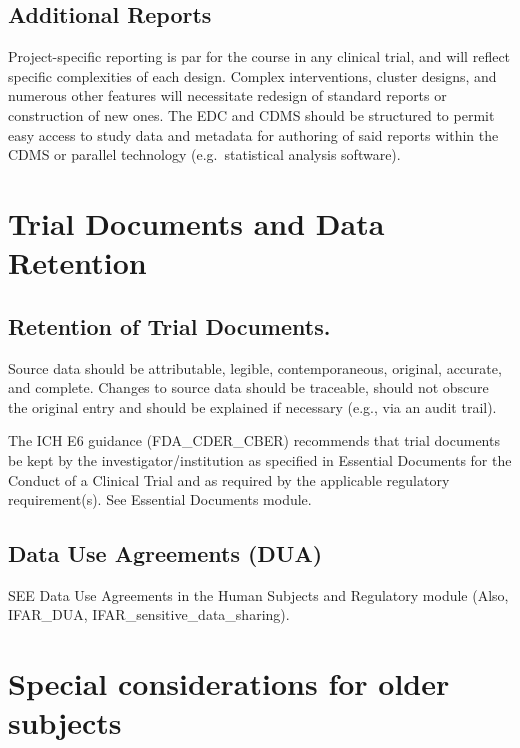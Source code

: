 \documentclass[]{book}
\begin{document}
\subsection{Additional Reports}\label{additional-reports}

Project-specific reporting is par for the course in any clinical trial,
and will reflect specific complexities of each design. Complex
interventions, cluster designs, and numerous other features will
necessitate redesign of standard reports or construction of new ones.
The EDC and CDMS should be structured to permit easy access to study
data and metadata for authoring of said reports within the CDMS or
parallel technology (e.g.~statistical analysis software).

\section{Trial Documents and Data
Retention}\label{trial-documents-and-data-retention}

\subsection{Retention of Trial
Documents.}\label{retention-of-trial-documents.}

Source data should be attributable, legible, contemporaneous, original,
accurate, and complete. Changes to source data should be traceable,
should not obscure the original entry and should be explained if
necessary (e.g., via an audit trail).

The ICH E6 guidance (FDA\_CDER\_CBER) recommends that trial documents be
kept by the investigator/institution as specified in Essential Documents
for the Conduct of a Clinical Trial and as required by the applicable
regulatory requirement(s). See Essential Documents module.

\subsection{Data Use Agreements (DUA)}\label{data-use-agreements-dua}

SEE Data Use Agreements in the Human Subjects and Regulatory module
(Also, IFAR\_DUA, IFAR\_sensitive\_data\_sharing).

\section{Special considerations for older
subjects}\label{special-considerations-for-older-subjects-13}
\end{document}
